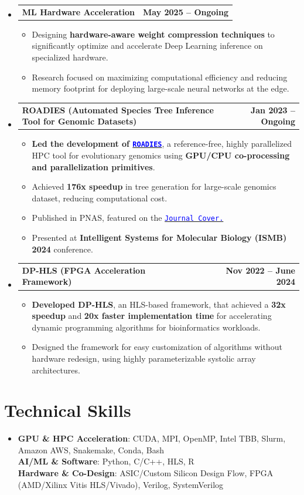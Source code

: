 \documentclass[letterpaper,11pt]{article}
\makeatletter
\newcommand{\resumeItem}[1]{
  \item{
    {#1 \vspace{-2pt}}
  }
}
\newcommand{\resumenewheading}[2]{
  \vspace{-2pt}\item
    \begin{tabular*}{1.0\textwidth}[t]{l@{\extracolsep{\fill}}r}
      \textbf{#1} & \textbf{#2} \\
    \end{tabular*}\vspace{-7pt}
}
\newcommand{\resumeSubHeadingListStart}{\begin{itemize}[leftmargin=0.0in, label={}]}
\newcommand{\resumeSubHeadingListEnd}{\end{itemize}}
\newcommand{\resumeItemListStart}{\begin{itemize}}
\newcommand{\resumeItemListEnd}{\end{itemize}\vspace{-5pt}}
\makeatother
\begin{document}
  \resumeSubHeadingListStart
    \resumenewheading
      {ML Hardware Acceleration}{May 2025 -- Ongoing}
      \resumeItemListStart
        \resumeItem{Designing \textbf{hardware-aware weight compression techniques} to significantly optimize and accelerate Deep Learning inference on specialized hardware.} 
        \resumeItem{Research focused on maximizing computational efficiency and reducing memory footprint for deploying large-scale neural networks at the edge.}
      \resumeItemListEnd
      \resumenewheading
      {ROADIES (Automated Species Tree Inference Tool for Genomic Datasets)}{Jan 2023 -- Ongoing}
    \resumeItemListStart
        \resumeItem{\textbf{Led the development of \href{https://turakhia.ucsd.edu/ROADIES/}{\textcolor{blue}{\texttt{ROADIES}}}}, a reference-free, highly parallelized HPC tool for evolutionary genomics using \textbf{GPU/CPU co-processing and parallelization primitives}.}
        \resumeItem{Achieved \textbf{176x speedup} in tree generation for large-scale genomics dataset, reducing computational cost.}
        \resumeItem{Published in PNAS, featured on the \href{https://www.pnas.org/toc/pnas/122/19}{\textcolor{blue}{\texttt{Journal Cover.}}}}
        \resumeItem{Presented at \textbf{Intelligent Systems for Molecular Biology (ISMB) 2024} conference.}
      \resumeItemListEnd

    \resumenewheading
      {DP-HLS (FPGA Acceleration Framework)}{Nov 2022 -- June 2024}
      \resumeItemListStart
        \resumeItem{\textbf{Developed DP-HLS}, an HLS-based framework, that achieved a \textbf{32x speedup} and \textbf{20x faster implementation time} for accelerating dynamic programming algorithms for bioinformatics workloads.}
        \resumeItem{Designed the framework for easy customization of algorithms without hardware redesign, using highly parameterizable systolic array architectures.}
      \resumeItemListEnd

  \resumeSubHeadingListEnd



\section{Technical Skills}
 \begin{itemize}[leftmargin=0in,label={}]

    \item{
     \textbf{GPU \& HPC Acceleration}: CUDA, MPI, OpenMP, Intel TBB, Slurm, Amazon AWS, Snakemake, Conda, Bash \\
     \textbf{AI/ML \& Software}: Python, C/C++, HLS, R \\
     \textbf{Hardware \& Co-Design}: ASIC/Custom Silicon Design Flow, FPGA (AMD/Xilinx Vitis HLS/Vivado), Verilog, SystemVerilog \\
     }
     \end{itemize}
 \vspace{-16pt}
\end{document}
